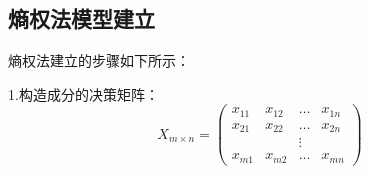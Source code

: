 \documentclass[UTF8]{ctexart}
\begin{document}





                \subsection{熵权法模型建立}
                熵权法建立的步骤如下所示：

                1.构造成分的决策矩阵：
                \begin{equation}
                    X_{m \times n}=\left(\begin{array}{cccc}
                            x_{11}  & x_{12}  & \ldots & x_{1 n} \\
                            x_{21}  & x_{22}  & \ldots & x_{2 n} \\
                                    &         & \vdots &         \\
                            x_{m 1} & x_{m 2} & \ldots & x_{m n}
                        \end{array}\right)
                \end{equation}
\end{document}
